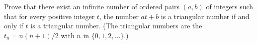 Prove that there exist an infinite number of ordered pairs $(a,b)$ of
integers such that for every positive integer $t$, the number $at+b$
is a triangular number if and only if $t$ is a triangular number. (The
triangular numbers are the $t_n = n(n+1)/2$ with $n$ in $\{0,1,2,\dots\}$.)
